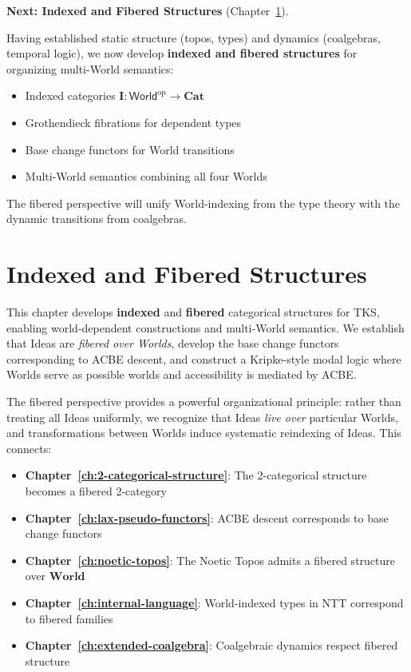 \begin{remark}
\textbf{Next: Indexed and Fibered Structures} (Chapter~\ref{ch:indexed-fibered}).

Having established static structure (topos, types) and dynamics (coalgebras, temporal
logic), we now develop \textbf{indexed and fibered structures} for organizing
multi-World semantics:
\begin{itemize}
  \item Indexed categories $\mathbf{I} : \mathsf{World}^{\mathrm{op}} \to \mathbf{Cat}$
  \item Grothendieck fibrations for dependent types
  \item Base change functors for World transitions
  \item Multi-World semantics combining all four Worlds
\end{itemize}
The fibered perspective will unify World-indexing from the type theory with the
dynamic transitions from coalgebras.
\end{remark}

\chapter{Indexed and Fibered Structures}
\label{ch:indexed-fibered}

\begin{tcolorbox}[colback=blue!5!white,colframe=blue!75!black,title=\vnewthree]
This chapter develops \textbf{indexed} and \textbf{fibered} categorical structures
for TKS, enabling world-dependent constructions and multi-World semantics. We
establish that Ideas are \emph{fibered over Worlds}, develop the base change
functors corresponding to ACBE descent, and construct a Kripke-style modal logic
where Worlds serve as possible worlds and accessibility is mediated by ACBE.
\end{tcolorbox}

The fibered perspective provides a powerful organizational principle: rather than
treating all Ideas uniformly, we recognize that Ideas \emph{live over} particular
Worlds, and transformations between Worlds induce systematic reindexing of Ideas.
This connects:
\begin{itemize}
  \item \textbf{Chapter~\ref{ch:2-categorical-structure}}: The 2-categorical structure
        becomes a fibered 2-category
  \item \textbf{Chapter~\ref{ch:lax-pseudo-functors}}: ACBE descent corresponds to
        base change functors
  \item \textbf{Chapter~\ref{ch:noetic-topos}}: The Noetic Topos admits a fibered
        structure over $\mathbf{World}$
  \item \textbf{Chapter~\ref{ch:internal-language}}: World-indexed types in NTT
        correspond to fibered families
  \item \textbf{Chapter~\ref{ch:extended-coalgebra}}: Coalgebraic dynamics respect
        fibered structure
\end{itemize}

